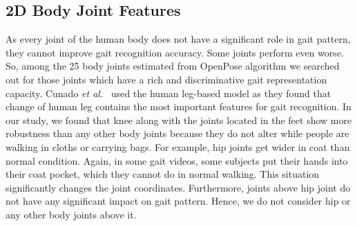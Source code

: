 \subsection{2D Body Joint Features}
As every joint of the human body does not have a significant role in gait pattern, they cannot improve gait recognition accuracy. Some joints perform even worse. So, among the 25 body joints estimated from OpenPose algorithm we searched out for those joints which have a rich and discriminative gait representation capacity. Cunado \textit{et al.}~\cite{Cunado_97} used the human leg-based model as they found that change of human leg contains the most important features for gait recognition.  In our study, we found that knee along with the joints located in the feet show more robustness than any other body joints because they do not alter while people are walking in cloths or carrying bags. For example, hip joints get wider in coat than normal condition. Again, in some gait videos, some subjects put their hands into their coat pocket, which they cannot do in normal walking. This situation significantly changes the joint coordinates. Furthermore, joints above hip joint do not have any significant impact on gait pattern. Hence, we do not consider hip or any other body joints above it.

